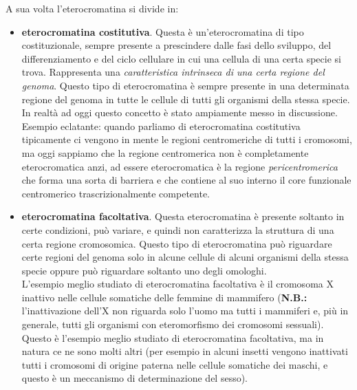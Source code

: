 \documentclass[11pt]{book}
\begin{document}
A sua volta l’eterocromatina si divide in:
\begin{itemize}
\item \textbf{eterocromatina costitutiva}. Questa è un'eterocromatina di tipo costituzionale, sempre presente a prescindere dalle fasi dello sviluppo, del differenziamento e del ciclo cellulare in cui una cellula di una certa specie si trova. Rappresenta una \emph{caratteristica intrinseca di una certa regione del genoma}. Questo tipo di eterocromatina è sempre presente in una determinata regione del genoma in tutte le cellule di tutti gli organismi della stessa specie.\\
In realtà ad oggi questo concetto è stato ampiamente messo in discussione.
Esempio eclatante: quando parliamo di eterocromatina costitutiva tipicamente ci vengono in mente le regioni centromeriche di tutti i cromosomi, ma oggi sappiamo che la regione centromerica non è completamente eterocromatica anzi, ad essere eterocromatica è la regione \emph{pericentromerica} che forma una sorta di barriera e che contiene al suo interno il core funzionale centromerico trascrizionalmente competente.
\item \textbf{eterocromatina facoltativa}. Questa eterocromatina è presente soltanto in certe condizioni, può variare, e quindi non caratterizza la struttura di una certa regione cromosomica. 
Questo tipo di eterocromatina può riguardare certe regioni del genoma solo in alcune cellule di alcuni organismi della stessa specie oppure può riguardare soltanto uno degli omologhi.\\
L’esempio meglio studiato di eterocromatina facoltativa è il cromosoma X inattivo nelle cellule somatiche delle femmine di mammifero (\textbf{N.B.:} l'inattivazione dell'X non riguarda solo l’uomo ma tutti i mammiferi e, più in generale, tutti gli organismi con eteromorfismo dei cromosomi sessuali).
Questo è l’esempio meglio studiato di eterocromatina facoltativa, ma in natura ce ne sono molti altri (per esempio in alcuni insetti vengono inattivati tutti i cromosomi di origine paterna nelle cellule somatiche dei maschi, e questo è un meccanismo di determinazione del sesso).
\end{itemize}
\end{document}
